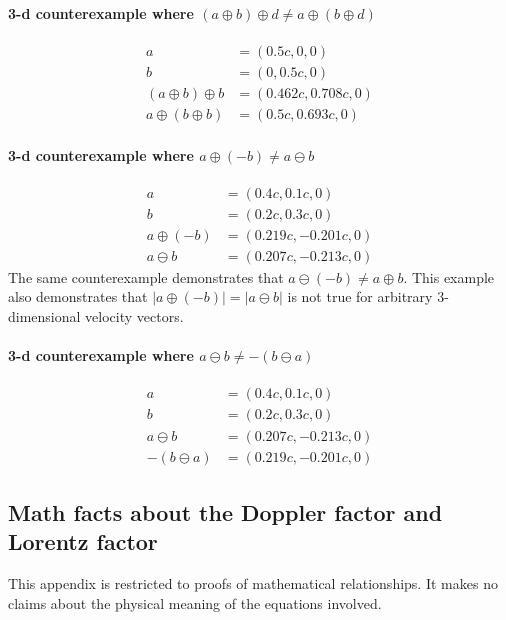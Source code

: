 \documentclass[a4paper]{article}
\theoremstyle{plain}
\theoremstyle{definition}
\begin{document}
\paragraph{3-d counterexample where $(a \oplus b) \oplus d \neq a \oplus (b \oplus d)$}
\begin{align*}
  a & = (0.5c, 0, 0) \\
  b & = (0, 0.5c, 0) \\
  (a \oplus b) \oplus b & = (0.462c, 0.708c, 0) \\
  a \oplus (b \oplus b) & = (0.5c, 0.693c, 0)
\end{align*}

\paragraph{3-d counterexample where $a \oplus (-b) \neq a \ominus b$}
\begin{align*}
  a & = (0.4c, 0.1c, 0) \\
  b & = (0.2c, 0.3c, 0) \\
  a \oplus (-b) & = (0.219c, -0.201c, 0) \\
  a \ominus b & = (0.207c, -0.213c, 0)
\end{align*}
The same counterexample demonstrates that
$a \ominus (-b) \neq a \oplus b$.
This example also demonstrates that
$|a \oplus (-b)| = |a \ominus b|$ is not true for arbitrary
3-dimensional velocity vectors.

\paragraph{3-d counterexample where $a \ominus b \neq - (b \ominus a)$}
\begin{align*}
  a & = (0.4c, 0.1c, 0) \\
  b & = (0.2c, 0.3c, 0) \\
  a \ominus b & = (0.207c, -0.213c, 0) \\
  -(b \ominus a) & = (0.219c, -0.201c, 0)
\end{align*}


\subsection{Math facts about the Doppler factor and Lorentz factor}
\label{app:DopplerFactor}

This appendix is restricted to proofs of mathematical relationships.
It makes no claims about the physical meaning of the equations
involved.
\end{document}
